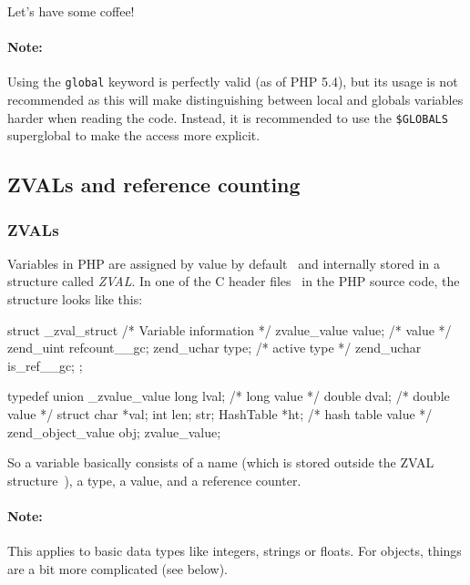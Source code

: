 \begin{textcode}
Let's have some coffee!
\end{textcode}

\paragraph{Note:} Using the \texttt{global} keyword is perfectly valid (as of PHP 5.4), but its usage is not recommended as this will make distinguishing between local and globals variables harder when reading the code. Instead, it is recommended to use the \texttt{\$GLOBALS} superglobal to make the access more explicit. ~\cite{typo3-cgl-php-syntax-formatting}



\subsection{ZVALs and reference counting}


\subsubsection{ZVALs}
\label{sec:zvals}

Variables in PHP are assigned by value by default~\cite{php-manual-variables} and internally stored in a structure called \emph{ZVAL}. In one of the C header files~\cite{php-src-api-headers} in the PHP source code, the structure looks like this:

\begin{ccode}
struct _zval_struct {
  /* Variable information */
  zvalue_value value;       /* value */
  zend_uint refcount__gc;
  zend_uchar type;          /* active type */
  zend_uchar is_ref__gc;
};

typedef union _zvalue_value {
  long lval;     /* long value */
  double dval;   /* double value */
  struct {
    char *val;
    int len;
  } str;
  HashTable *ht;  /* hash table value */
  zend_object_value obj;
} zvalue_value;
\end{ccode}

So a variable basically consists of a name (which is stored outside the ZVAL structure~\cite{php-extensions-zval}), a type, a value, and a reference counter.

\paragraph{Note:} This applies to basic data types like integers, strings or floats. For objects, things are a bit more complicated (see below).

